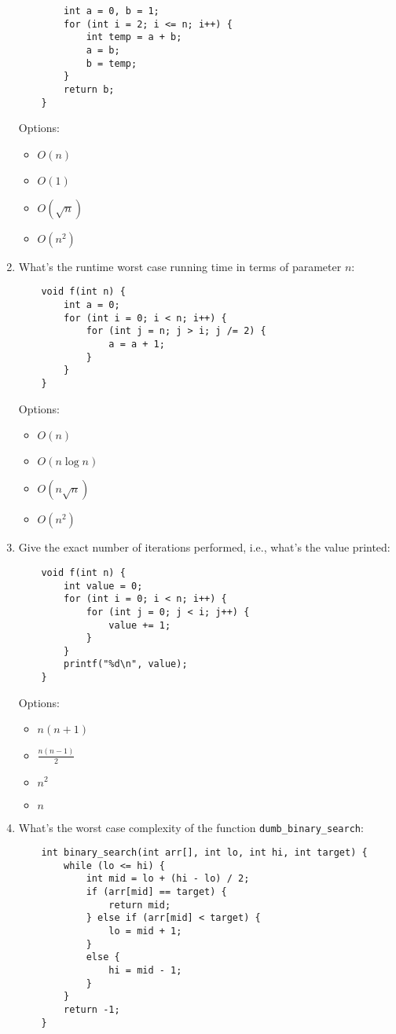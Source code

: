 \documentclass{article}
\begin{document}
\begin{enumerate}
\begin{lstlisting}
        int a = 0, b = 1;
        for (int i = 2; i <= n; i++) {
            int temp = a + b;
            a = b;
            b = temp;
        }
        return b;
    }
    \end{lstlisting}
    Options:
    \begin{itemize}
        \item \( O(n) \) \hl{\checkmark}
        \item \( O(1) \)
        \item \( O(\sqrt{n}) \)
        \item \( O(n^2) \)
    \end{itemize}

    \item What's the runtime worst case running time in terms of parameter \( n \):
    \begin{lstlisting}
    void f(int n) {
        int a = 0;
        for (int i = 0; i < n; i++) {
            for (int j = n; j > i; j /= 2) {
                a = a + 1;
            }
        }
    }
    \end{lstlisting}
    Options:
    \begin{itemize}
        \item \( O(n) \)
        \item \( O(n \log n) \) \hl{\checkmark}
        \item \( O(n \sqrt{n}) \)
        \item \( O(n^2) \) 
    \end{itemize}

    \item Give the exact number of iterations performed, i.e., what’s the value printed:
    \begin{lstlisting}
    void f(int n) {
        int value = 0;
        for (int i = 0; i < n; i++) {
            for (int j = 0; j < i; j++) {
                value += 1;
            }
        }
        printf("%d\n", value);
    }
    \end{lstlisting}
    Options:
    \begin{itemize}
        \item \( n(n+1) \)
        \item \( \frac{n(n-1)}{2} \) \hl{\checkmark}
        \item \( n^2 \)
        \item \( n \)
    \end{itemize}
    \newpage

    \item What’s the worst case complexity of the function \texttt{dumb\_binary\_search}:
    \begin{lstlisting}
    int binary_search(int arr[], int lo, int hi, int target) {
        while (lo <= hi) {
            int mid = lo + (hi - lo) / 2;
            if (arr[mid] == target) {
                return mid;
            } else if (arr[mid] < target) {
                lo = mid + 1;
            }
            else {
                hi = mid - 1;
            }
        }
        return -1;
    }
    

\end{lstlisting}
\end{enumerate}
\end{document}
